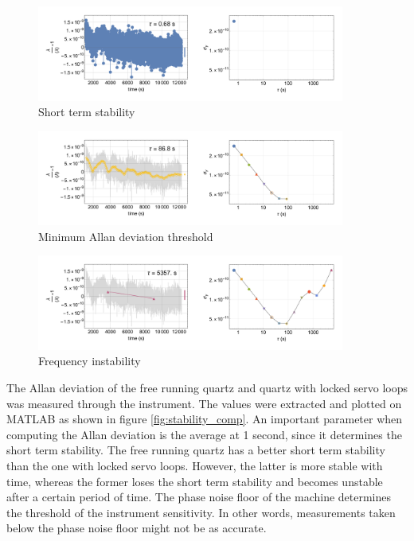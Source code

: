 \documentclass[a4paper,12pt]{article}
\begin{document}
\begin{figure}[!h]
    \centering
    \includegraphics[width=0.9\textwidth]{Images/allan01.png}
    \captionsetup{justification=centering}
    \caption{Short term stability} 
    \label{fig:allan01}
\end{figure}
\begin{figure}[!h]
    \centering
    \includegraphics[width=0.9\textwidth]{Images/allan08.png}
    \captionsetup{justification=centering}
    \caption{Minimum Allan deviation threshold} 
    \label{fig:allan08}
\end{figure}
\begin{figure}[!h]
    \centering
    \includegraphics[width=0.9\textwidth]{Images/allan14.png}
    \captionsetup{justification=centering}
    \caption{Frequency instability} 
    \label{fig:allan14}
\end{figure}
\break
The Allan deviation of the free running quartz and quartz with locked servo loops was measured through the instrument. The values were extracted and plotted on MATLAB as shown in figure \ref{fig:stability_comp}. An important parameter when computing the Allan deviation is the average at 1 second, since it determines the short term stability. The free running quartz has a better short term stability than the one with locked servo loops. However, the latter is more stable with time, whereas the former loses the short term stability and becomes unstable after a certain period of time. The phase noise floor of the machine determines the threshold of the instrument sensitivity. In other words, measurements taken below the phase noise floor might not be as accurate.
\end{document}
